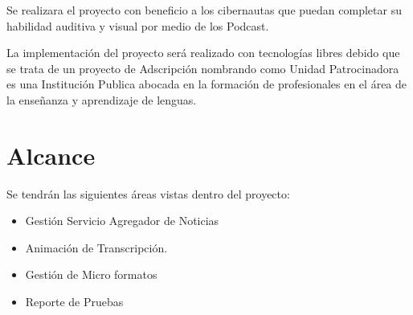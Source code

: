 Se realizara el proyecto con beneficio a los cibernautas que puedan completar su
habilidad auditiva y visual por medio de los Podcast.

La implementación del proyecto será realizado con tecnologías libres debido que se
trata de un proyecto de Adscripción nombrando como Unidad Patrocinadora es una
Institución Publica abocada en la formación de profesionales en el área de la
enseñanza y aprendizaje de lenguas.

\section{Alcance}

Se tendrán las siguientes áreas vistas dentro del proyecto:

\begin{itemize}

\item Gestión Servicio Agregador de Noticias
\item Animación de Transcripción.
\item Gestión de Micro formatos
\item Reporte de Pruebas

\end{itemize}